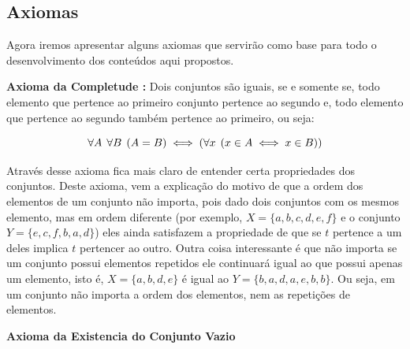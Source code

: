     \subsection{Axiomas}
    
    Agora iremos apresentar alguns axiomas que servirão como base para todo o desenvolvimento dos conteúdos aqui propostos.
    
    \textbf{Axioma da Completude :} Dois conjuntos são iguais, se e somente se, todo elemento que pertence ao primeiro conjunto pertence ao segundo e, todo elemento que pertence ao segundo também pertence ao primeiro, ou seja:
    
    \[\forall A \hspace{1.5mm} \forall B \hspace{1.5mm} (A=B) \iff (\forall x \hspace{1.5mm} (x \in A \iff x \in B))\]
    
    Através desse axioma fica mais claro de entender certa propriedades dos conjuntos. Deste axioma, vem a explicação do motivo de que a ordem dos elementos de um conjunto não importa, pois dado dois conjuntos com os mesmos elemento, mas em ordem diferente (por exemplo, $X=\{a,b,c,d,e,f\}$ e o conjunto $Y=\{e,c,f,b,a,d\}$) eles ainda satisfazem a propriedade de que se $t$ pertence a um deles implica $t$ pertencer ao outro. Outra coisa interessante é que não importa se um conjunto possui elementos repetidos ele continuará igual ao que possui apenas um elemento, isto é, $X=\{a,b,d,e\}$ é igual ao $Y=\{b,a,d,a,e,b,b\}$. Ou seja, em um conjunto não importa a ordem dos elementos, nem as repetições de elementos.
    
    \textbf{Axioma da Existencia do Conjunto Vazio}
